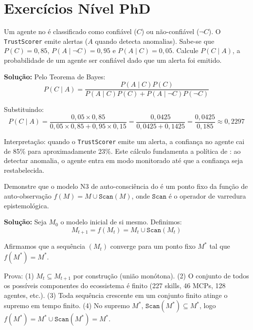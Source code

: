 \section{Exercícios Nível PhD}
\label{sec:exer-nivel-phd}
\nivelphd

\begin{exercicio}\label{exer:resol-bayes}
Um agente no \opencodeeco{} é classificado como confiável (\(C\)) ou
não-confiável (\(\neg C\)). O \texttt{TrustScorer} emite alertas (\(A\)
quando detecta anomalias). Sabe-se que \(P(C) = 0{,}85\),
\(P(A \mid \neg C) = 0{,}95\) e \(P(A \mid C) = 0{,}05\). Calcule
\(P(C \mid A)\), a probabilidade de um agente ser confiável dado que
um alerta foi emitido.
\end{exercicio}

\textbf{Solução:} Pelo Teorema de Bayes:
\[
P(C \mid A) = \frac{P(A \mid C)P(C)}{P(A \mid C)P(C) + P(A \mid \neg C)P(\neg C)}
\]

Substituindo:
\[
P(C \mid A) = \frac{0{,}05 \times 0{,}85}{0{,}05 \times 0{,}85 + 0{,}95 \times 0{,}15}
= \frac{0{,}0425}{0{,}0425 + 0{,}1425}
= \frac{0{,}0425}{0{,}185} \approx 0{,}2297
\]

Interpretação: quando o \texttt{TrustScorer} emite um alerta, a confiança
no agente cai de 85\% para aproximadamente 23\%. Este cálculo fundamenta
a política de : ao detectar anomalia, o agente entra
em modo monitorado até que a confiança seja restabelecida.

\begin{exercicio}\label{exer:resol-n3}
Demonstre que o modelo N3 de auto-consciência do \opencodeeco{} é
um ponto fixo da função de auto-observação \(f(M) = M \cup
\texttt{Scan}(M)\), onde \(\texttt{Scan}\) é o operador de varredura
epistemológica.
\end{exercicio}

\textbf{Solução:} Seja \(M_0\) o modelo inicial de si mesmo. Definimos:
\[
M_{t+1} = f(M_t) = M_t \cup \texttt{Scan}(M_t)
\]

Afirmamos que a sequência \((M_t)\) converge para um ponto fixo
\(M^*\) tal que \(f(M^*) = M^*\).

Prova: (1) \(M_t \subseteq M_{t+1}\) por construção (união monótona).
(2) O conjunto de todos os possíveis componentes do ecossistema é
finito (227 skills, 46 MCPs, 128 agentes, etc.). (3) Toda sequência
crescente em um conjunto finito atinge o supremo em tempo finito.
(4) No supremo \(M^*\), \(\texttt{Scan}(M^*) \subseteq M^*\), logo
\(f(M^*) = M^* \cup \texttt{Scan}(M^*) = M^*\).


